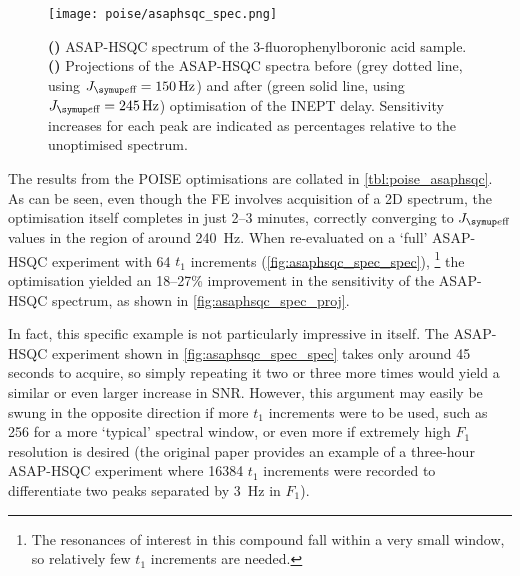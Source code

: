 \begin{figure}[htb]
    \centering
    \texttt{[image: poise/asaphsqc\_spec.png]}%
    {\label{fig:asaphsqc_spec_spec}}%
    {\label{fig:asaphsqc_spec_proj}}%
    \caption[Projections of ASAP-HSQC spectra before and after optimisation]{
        \textbf{()} ASAP-HSQC spectrum of the 3-fluorophenylboronic acid sample.
        \textbf{()} Projections of the ASAP-HSQC spectra before (grey dotted line, using $\Jeff = \qty{150}{\Hz}$) and after (green solid line, using $\Jeff = \qty{245}{\Hz}$) optimisation of the INEPT delay.
        Sensitivity increases for each peak are indicated as percentages relative to the unoptimised spectrum.
    }
    \label{fig:asaphsqc_spec}
\end{figure}

The results from the POISE optimisations are collated in \cref{tbl:poise_asaphsqc}.
As can be seen, even though the FE involves acquisition of a 2D spectrum, the optimisation itself completes in just 2--3 minutes, correctly converging to $\Jeff$ values in the region of around \qty{240}{\Hz}.
When re-evaluated on a `full' ASAP-HSQC experiment with 64 $t_1$ increments (\cref{fig:asaphsqc_spec_spec}),%
\footnote{The \carbon{} resonances of interest in this compound fall within a very small window, so relatively few $t_1$ increments are needed.}
the optimisation yielded an 18--27\% improvement in the sensitivity of the ASAP-HSQC spectrum, as shown in \cref{fig:asaphsqc_spec_proj}.

In fact, this specific example is not particularly impressive in itself.
The ASAP-HSQC experiment shown in \cref{fig:asaphsqc_spec_spec} takes only around 45 seconds to acquire, so simply repeating it two or three more times would yield a similar or even larger increase in SNR.
However, this argument may easily be swung in the opposite direction if more $t_1$ increments were to be used, such as 256 for a more `typical' \carbon{} spectral window, or even more if extremely high $F_1$ resolution is desired (the original paper\autocite{SchulzeSunninghausen2014JACS} provides an example of a three-hour ASAP-HSQC experiment where 16384 $t_1$ increments were recorded to differentiate two peaks separated by \qty{3}{\Hz} in $F_1$).
